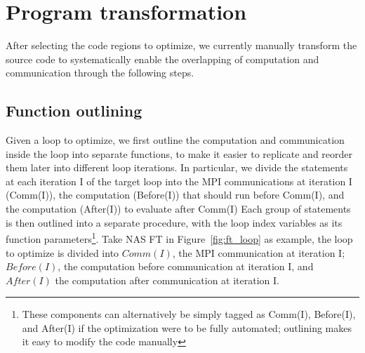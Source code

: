 \section{Program transformation}
\label{sec-opt}

After selecting the code regions to optimize,
  we currently manually transform the source code to systematically
 enable the overlapping of computation and communication
through the following steps.

\subsection{Function outlining}
Given a loop to optimize, we
first outline the computation and communication inside the loop into separate functions,
to make it easier to replicate and reorder them later into different loop iterations. In particular, we divide the statements at each iteration I of the target loop into the MPI communications at iteration I (Comm(I)),
the computation  (Before(I)) that should run before Comm(I), and the computation (After(I)) to evaluate after Comm(I)
Each group of statements is then outlined into a separate procedure,  with the loop index variables as its function parameters\footnote{These components can alternatively be simply tagged as Comm(I), Before(I), and After(I) if the optimization were to be fully automated; outlining makes it easy to modify the code manually}.
Take NAS FT in Figure~\ref{fig:ft_loop} as example,  the loop to optimize is divided into
  $Comm(I)$, the MPI communication at iteration I;
  $Before(I)$, the computation before communication at iteration I,
  and $After(I)$ the computation after communication at iteration I.

